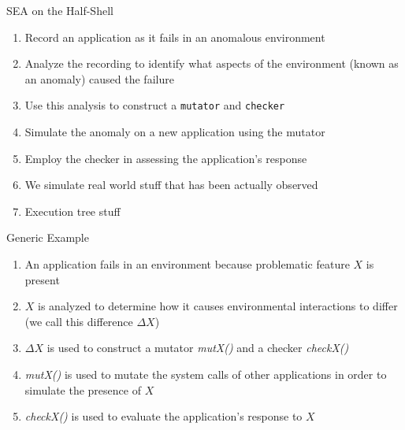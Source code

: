 \documentclass[pdf]{beamer}
\begin{document}
\begin{frame}{SEA on the Half-Shell}

  \begin{enumerate}
    \item{Record an application as it fails in an anomalous environment}
    \item{Analyze the recording to identify what aspects of the environment
      (known as an anomaly) caused the failure}
    \item{Use this analysis to construct a {\tt mutator} and {\tt checker}}
    \item{Simulate the anomaly on a new application using the mutator}
    \item{Employ the checker in assessing the application's response}

    \item{We simulate real world stuff that has been actually observed}
    \item{Execution tree stuff }
  \end{enumerate}
\end{frame}


\begin{frame}{Generic Example}
  \begin{enumerate}
    \item{An application fails in an environment because problematic
      feature $X$ is present}
    \item{$X$ is analyzed to determine how it causes environmental
      interactions to differ (we call this difference $\Delta X$)}
    \item{$\Delta X$ is used to construct a mutator \textit{mutX()} and
      a checker \textit{checkX()}}
    \item{\textit{mutX()} is used to mutate the system calls of other
      applications in order to simulate the presence of $X$}
    \item{\textit{checkX()} is used to evaluate the application's response
      to $X$}
  \end{enumerate}
\end{frame}
\end{document}
